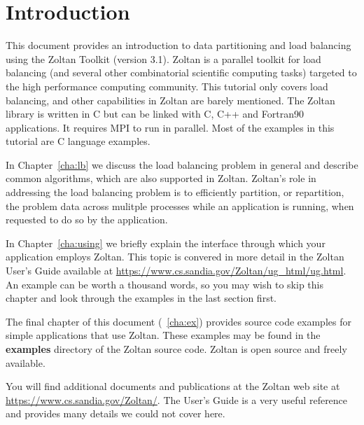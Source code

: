 %
% 
%
\chapter{Introduction}

This document provides an introduction to data partitioning
and load balancing using the Zoltan Toolkit (version 3.1).  
Zoltan is a parallel toolkit for load balancing
(and several other combinatorial scientific computing tasks) 
targeted to the high performance computing community.  
This tutorial only covers load balancing,
and other capabilities in Zoltan are barely mentioned.
The Zoltan library is written in C but can be
linked with C, C++ and Fortran90 applications.  
It requires MPI to run in parallel.
Most of the examples in this tutorial are C language examples.

In Chapter~\ref{cha:lb} we
discuss the load balancing problem in general and describe
common algorithms, which are also supported in Zoltan.
Zoltan's role in addressing the load balancing problem is to 
efficiently partition,
or repartition, the problem data across mulitple processes while an
application is running, when requested to do so by the application.


In Chapter~\ref{cha:using} we briefly explain the interface
through which your application employs Zoltan.  This topic is
convered in more detail in the
Zoltan User's Guide available at
\url{https://www.cs.sandia.gov/Zoltan/ug_html/ug.html}.
An example can be worth a thousand words, so you may wish to 
skip this chapter and look through the examples in the last section first.

The final chapter of this document (~\ref{cha:ex}) provides
source code examples for simple applications that use Zoltan.
These examples may be found in the \textbf{examples} directory
of the Zoltan source code.  Zoltan is open source and freely available.

You will find additional documents and publications at the
Zoltan web site at \url{https://www.cs.sandia.gov/Zoltan/}.
The User's Guide is a very useful reference and provides
many details we could not cover here.

